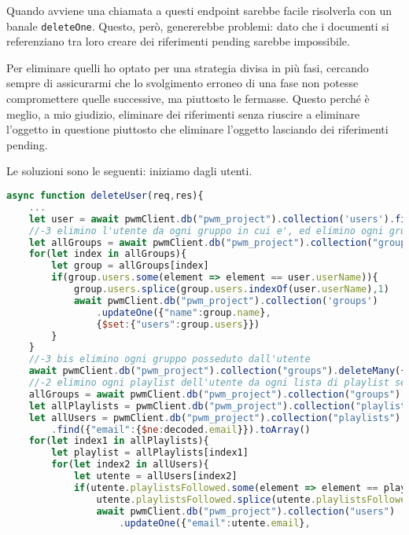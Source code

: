 Quando avviene una chiamata a questi endpoint sarebbe facile risolverla con un banale \verb|deleteOne|. Questo, però, genererebbe problemi: dato che i documenti si referenziano tra loro creare dei riferimenti pending sarebbe impossibile.

Per eliminare quelli ho optato per una strategia divisa in più fasi, cercando sempre di assicurarmi che lo svolgimento erroneo di una fase non potesse compromettere quelle successive, ma piuttosto le fermasse. Questo perché è meglio, a mio giudizio, eliminare dei riferimenti senza riuscire a eliminare l'oggetto in questione piuttosto che eliminare l'oggetto lasciando dei riferimenti pending.

Le soluzioni sono le seguenti: iniziamo dagli utenti.
\begin{lstlisting}[language=JavaScript]
async function deleteUser(req,res){ 
    ...
    let user = await pwmClient.db("pwm_project").collection('users').findOne({"email": decoded.email})
    //-3 elimino l'utente da ogni gruppo in cui e', ed elimino ogni gruppo che sia owned, rimuovendolo prima da ogni utente che sia in quel gruppo
    let allGroups = await pwmClient.db("pwm_project").collection("groups").find({}).toArray()
    for(let index in allGroups){
        let group = allGroups[index]
        if(group.users.some(element => element == user.userName)){
            group.users.splice(group.users.indexOf(user.userName),1)
            await pwmClient.db("pwm_project").collection('groups')
                .updateOne({"name":group.name},
                {$set:{"users":group.users}})
        }
    }
    //-3 bis elimino ogni gruppo posseduto dall'utente
    await pwmClient.db("pwm_project").collection("groups").deleteMany({"owner":user.userName})
    //-2 elimino ogni playlist dell'utente da ogni lista di playlist seguite altrui
    allGroups = await pwmClient.db("pwm_project").collection("groups").find({}).toArray()
    let allPlaylists = pwmClient.db("pwm_project").collection("playlists").find({"owner":user.userName}).toArray()
    let allUsers = pwmClient.db("pwm_project").collection("playlists")
        .find({"email":{$ne:decoded.email}}).toArray()
    for(let index1 in allPlaylists){
        let playlist = allPlaylists[index1]
        for(let index2 in allUsers){
            let utente = allUsers[index2]
            if(utente.playlistsFollowed.some(element => element == playlist.name)){
                utente.playlistsFollowed.splice(utente.playlistsFollowed.indexOf(playlist.name),1)
                await pwmClient.db("pwm_project").collection("users")
                    .updateOne({"email":utente.email},

\end{lstlisting}
